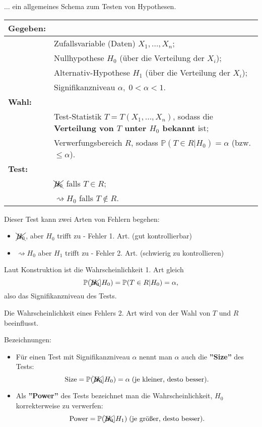 \documentclass{tstextbook}
\newcommand{\Prob}{\mathbb P}
\begin{document}
$\ldots$ ein allgemeines Schema zum Testen von Hypothesen. 
\vspace{0.5cm}

\begin{tabular}{ll}
	\textbf{Gegeben:}	& 	\\
	\midrule
				& Zufallsvariable (Daten) $ X_1,\ldots, X_n $; \\
				& Nullhypothese $ H_0 $ (über die Verteilung der $ X_i $); \\
				& Alternativ-Hypothese $ H_1 $ (über die Verteilung der $ X_i $); \\
				& Signifikanzniveau $ \alpha, \; 0<\alpha<1. $ \\
	\midrule
	\textbf{Wahl: }		& \\
	\midrule
				& Test-Statistik $ T = T(X_1,\ldots,X_n) $, sodass die \textbf{Verteilung von $ T $ unter $ H_0 $ bekannt} ist; \\
				& Verwerfungsbereich $ R $, sodass $ \Prob(T\in R|H_0) = \alpha $ (bzw. $ \le \alpha $). \\
	\midrule
	\textbf{Test: }		& \\
	\midrule
				&  $ \xcancel{H_0} $ falls $ T\in R $; \\
				& $ \rightsquigarrow H_0 $ falls $ T\notin R $.
\end{tabular}
\vspace{0.5cm}

Dieser Test kann zwei Arten von Fehlern begehen:
\begin{itemize}
	\item $ \xcancel{H_0} $, aber $ H_0 $ trifft zu - Fehler 1. Art. (gut kontrollierbar)
	\item $ \rightsquigarrow H_0 $ aber $ H_1 $ trifft zu - Fehler 2. Art. (schwierig zu kontrollieren)
\end{itemize}

Laut Konstruktion ist die Wahrscheinlichkeit 1. Art gleich 
	\[
	\Prob(\xcancel{H_0}|H_0) = \Prob(T\in R|H_0) = \alpha,
	\]
also das Signifikanzniveau des Tests.

Die Wahrscheinlichkeit eines Fehlers 2. Art wird von der Wahl von $ T $ und $ R $ beeinflusst. 

\begin{remark}
	Bezeichnungen: 
	\begin{itemize}
		\item Für einen Test mit Signifikanzniveau $ \alpha $ nennt man $ \alpha $ auch die \textbf{''Size''} des Tests:
		\[
		\text{Size} = \Prob(\xcancel{H_0}|H_0)=\alpha \; (\text{je kleiner, desto besser}).
		\]
		\item Als \textbf{''Power''} des Tests bezeichnet man die Wahrscheinlichkeit, $ H_0 $ korrekterweise zu verwerfen:
		\[
		\text{Power} = \Prob(\xcancel{H_0}|H_1) \; (\text{je größer, desto besser}).
		\]
	\end{itemize}
\end{remark}
\end{document}
